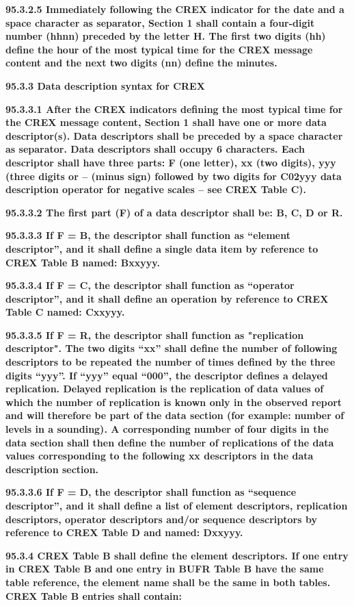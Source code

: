 \textbf{95.3.2.5 Immediately following the CREX indicator for the date and a space character as separator, Section 1 shall contain a four-digit number (hhnn) preceded by the letter H. The first two digits (hh) define the hour of the most typical time for the CREX message content and the next two digits (nn) define the minutes.}

\textbf{95.3.3 Data description syntax for CREX}

\textbf{95.3.3.1 After the CREX indicators defining the most typical time for the CREX message content, Section 1 shall have one or more data descriptor(s). Data descriptors shall be preceded by a space character as separator. Data descriptors shall occupy 6 characters. Each descriptor shall have three parts: F (one letter), xx (two digits), yyy (three digits or -- (minus sign) followed by two digits for C02yyy data description operator for negative scales -- see CREX Table C).}

\textbf{95.3.3.2 The first part (F) of a data descriptor shall be: B, C, D or R.}

\textbf{95.3.3.3 If F = B, the descriptor shall function as ``element descriptor'', and it shall define a single data item by reference to CREX Table B named: Bxxyyy.}

\textbf{95.3.3.4 If F = C, the descriptor shall function as ``operator descriptor'', and it shall define an operation by reference to CREX Table C named: Cxxyyy.}

\textbf{95.3.3.5 If F = R, the descriptor shall function as "replication descriptor". The two digits ``xx'' shall define the number of following descriptors to be repeated the number of times defined by the three digits ``yyy''. If ``yyy'' equal ``000'', the descriptor defines a delayed replication. Delayed replication is the replication of data values of which the number of replication is known only in the observed report and will therefore be part of the data section (for example: number of levels in a sounding). A corresponding number of four digits in the data section shall then define the number of replications of the data values corresponding to the following xx descriptors in the data description section.}

\textbf{95.3.3.6 If F = D, the descriptor shall function as ``sequence descriptor'', and it shall define a list of element descriptors, replication descriptors, operator descriptors and/or sequence descriptors by reference to CREX Table D and named: Dxxyyy.}

\textbf{95.3.4 CREX Table B shall define the element descriptors. If one entry in CREX Table B and one entry in BUFR Table B have the same table reference, the element name shall be the same in both tables. CREX Table B entries shall contain:}

